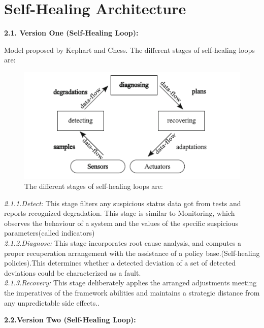 \chapter{Self-Healing Architecture} \label{ch:selfHelingArchitecture}

\textbf{2.1. Version One (Self-Healing Loop):\\}

Model proposed by Kephart and Chess. The different stages of self-healing loops are: \\


\begin{figure}[H]
\includegraphics[width=5in]{img/SelfHealingStagesHarald}
\caption{The different stages of self-healing loops are:}
\end{figure}

\textit{2.1.1.Detect:} This stage filters any suspicious status data got from tests and reports recognized degradation. This stage is similar to Monitoring, which observes the behaviour of a system and the values of the specific suspicious parameters(called indicators)\\

\textit{2.1.2.Diagnose:} This stage incorporates root cause analysis, and computes a proper recuperation arrangement with the assistance of a policy base.(Self-healing policies).This determines whether a detected deviation of a set of detected deviations could be characterized as a fault.\\

\textit{2.1.3.Recovery:} This stage deliberately applies the arranged adjustments meeting the imperatives of the framework abilities and maintains a strategic distance from any unpredictable side effects.\cite{Harald:SelfHealingSurvey:2011}.   

\textbf{2.2.Version Two (Self-Healing Loop):\\}\\

